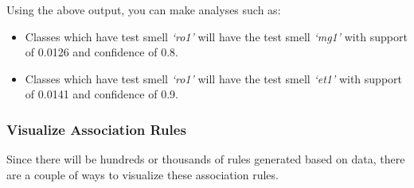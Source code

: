 Using the above output, you can make analyses such as:
\begin{itemize}
  \item Classes which have test smell \textit{‘ro1’} will have the test smell \textit{‘mg1’} with support of 0.0126 and confidence of 0.8.
  \item Classes which have test smell \textit{‘ro1’} will have the test smell \textit{‘et1’} with support of 0.0141 and confidence of 0.9.
\end{itemize}
\par\hfill

\subsubsection{Visualize Association Rules}

Since there will be hundreds or thousands of rules generated based on data, there are a couple of ways to visualize these association rules.

